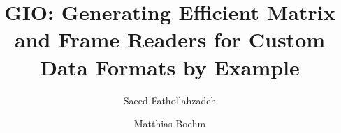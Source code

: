 \title[GIO: Generating Efficient Matrix and Frame Readers for Custom Data Formats by Example]{GIO: Generating Efficient Matrix and Frame Readers for Custom Data Formats by Example}

\author{Saeed Fathollahzadeh} 

\author{Matthias Boehm} 

\renewcommand{\shortauthors}{Saeed Fathollahzadeh \& Matthias Boehm}

\maketitle